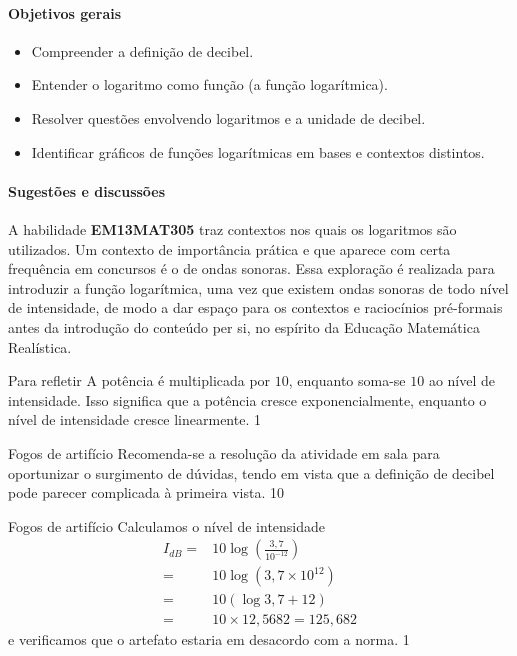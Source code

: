 \clearpage
\def\currentcolor{session1}
\begin{texto}
{
	\paragraph{Objetivos gerais}
	\begin{itemize}
	\item Compreender a definição de decibel.
	\item Entender o logaritmo como função (a função logarítmica).
	\item Resolver questões envolvendo logaritmos e a unidade de decibel.
	\item Identificar gráficos de funções logarítmicas em bases e contextos distintos.
	\end{itemize}

	\paragraph{Sugestões e discussões}
	A habilidade \textbf{EM13MAT305} traz contextos nos quais os logaritmos são utilizados. Um contexto de importância prática e que aparece com certa frequência em concursos é o de ondas sonoras. Essa exploração é realizada para introduzir a função logarítmica, uma vez que existem ondas sonoras de todo nível de intensidade, de modo a dar espaço para os contextos e raciocínios pré-formais antes da introdução do conteúdo per si, no espírito da Educação Matemática Realística.
}
\end{texto}
\marginpar{\vspace{.5em}}
\begin{answer}{Para refletir}
{
	A potência é multiplicada por $10$, enquanto soma-se $10$ ao nível de intensidade. Isso significa que a potência cresce exponencialmente, enquanto o nível de intensidade cresce linearmente.
}{1}
\end{answer}
\clearmargin
\begin{sugestions}{Fogos de artifício}
{
	Recomenda-se a resolução da atividade em sala para oportunizar o surgimento de dúvidas, tendo em vista que a definição de decibel pode parecer complicada à primeira vista.
}{1}{0}
\end{sugestions}
\begin{answer}{Fogos de artifício}
{
	Calculamos o nível de intensidade
\begin{align*}
	I_{dB} =& 10 \log \left(\frac{3{,}7}{10^{-12}}\right)\\
	=& 10 \log (3{,}7\times 10^{12})\\
	=& 10 (\log 3{,}7+12)\\
	=& 10\times 12{,}5682 = 125{,}682
	\end{align*}
	e verificamos que o artefato estaria em desacordo com a norma.
}{1}
\end{answer}
\def\currentcolor{session4}
\begin{texto}
{
	
}
\end{texto}

